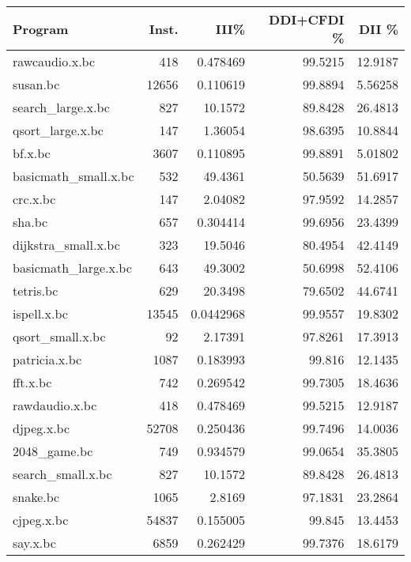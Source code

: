 \begin{tabular}{lrrrr}
\hline
 Program              &   Inst. &       III\% &   DDI+CFDI \% &    DII \% \\
\hline
 rawcaudio.x.bc       &     418 &  0.478469  &      99.5215 & 12.9187  \\
 susan.bc             &   12656 &  0.110619  &      99.8894 &  5.56258 \\
 search\_large.x.bc    &     827 & 10.1572    &      89.8428 & 26.4813  \\
 qsort\_large.x.bc     &     147 &  1.36054   &      98.6395 & 10.8844  \\
 bf.x.bc              &    3607 &  0.110895  &      99.8891 &  5.01802 \\
 basicmath\_small.x.bc &     532 & 49.4361    &      50.5639 & 51.6917  \\
 crc.x.bc             &     147 &  2.04082   &      97.9592 & 14.2857  \\
 sha.bc               &     657 &  0.304414  &      99.6956 & 23.4399  \\
 dijkstra\_small.x.bc  &     323 & 19.5046    &      80.4954 & 42.4149  \\
 basicmath\_large.x.bc &     643 & 49.3002    &      50.6998 & 52.4106  \\
 tetris.bc            &     629 & 20.3498    &      79.6502 & 44.6741  \\
 ispell.x.bc          &   13545 &  0.0442968 &      99.9557 & 19.8302  \\
 qsort\_small.x.bc     &      92 &  2.17391   &      97.8261 & 17.3913  \\
 patricia.x.bc        &    1087 &  0.183993  &      99.816  & 12.1435  \\
 fft.x.bc             &     742 &  0.269542  &      99.7305 & 18.4636  \\
 rawdaudio.x.bc       &     418 &  0.478469  &      99.5215 & 12.9187  \\
 djpeg.x.bc           &   52708 &  0.250436  &      99.7496 & 14.0036  \\
 2048\_game.bc         &     749 &  0.934579  &      99.0654 & 35.3805  \\
 search\_small.x.bc    &     827 & 10.1572    &      89.8428 & 26.4813  \\
 snake.bc             &    1065 &  2.8169    &      97.1831 & 23.2864  \\
 cjpeg.x.bc           &   54837 &  0.155005  &      99.845  & 13.4453  \\
 say.x.bc             &    6859 &  0.262429  &      99.7376 & 18.6179  \\

\end{tabular}

